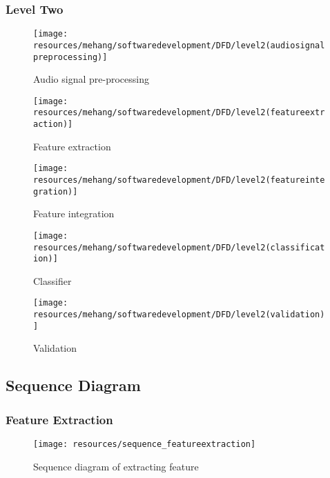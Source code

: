 \subsubsection{Level Two}
\vspace{20mm}
\begin{figure}[h!]
        \centering
        \texttt{[image: resources/mehang/softwaredevelopment/DFD/level2(audiosignalpreprocessing)]}
        \caption{Audio signal pre-processing}
        \label{fig:pre-processing}
\end{figure}
\vspace{20mm}
\begin{figure}[h!]
        \centering
        \texttt{[image: resources/mehang/softwaredevelopment/DFD/level2(featureextraction)]}
        \caption{Feature extraction}
\end{figure}
\vspace{90mm}
\begin{figure}[h!]
        \centering
        \texttt{[image: resources/mehang/softwaredevelopment/DFD/level2(featureintegration)]}
        \caption{Feature integration}
\end{figure}
\vspace{90mm}
\begin{figure}[h!]
        \centering
        \texttt{[image: resources/mehang/softwaredevelopment/DFD/level2(classification)]}
        \caption{Classifier}
        \label{fig:classifier}
\end{figure}
\vspace{50mm}
\begin{figure}[h!]
        \centering
        \texttt{[image: resources/mehang/softwaredevelopment/DFD/level2(validation)]}
        \caption{Validation}
        \label{fig:validation}
\end{figure}
\newpage
\newpage
\subsection{Sequence Diagram}
\subsubsection{Feature Extraction}
\begin{figure}[h!]
        \centering
        \texttt{[image: resources/sequence\_featureextraction]}
        \caption{Sequence diagram of extracting feature}
        \label{fig:sequence_featureextraction}
\end{figure}
\newpage
